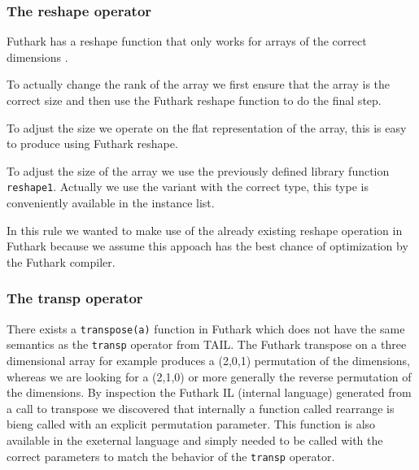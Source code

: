\documentclass[11pt]{article}
\begin{document}
\subsubsection{The reshape operator} 
Futhark has a reshape function that only works for arrays of the correct dimensions \cite{TroelsHenriksen}.

To actually change the rank of the array we first ensure that the array is the correct size and then use the Futhark reshape
function to do the final step.

To adjust the size we operate on the flat representation of the array, this is easy to produce using Futhark reshape.

To adjust the size of the array we use the previously defined library function {\tt reshape1}. Actually we use the variant with
the correct type, this type is conveniently available in the instance list.

In this rule we wanted to make use of the already existing reshape operation in Futhark because we assume this appoach has the best
chance of optimization by the Futhark compiler.

\subsubsection{The transp operator} 
There exists a {\tt transpose(a)} function in Futhark which does not have the same semantics as the {\tt transp} operator from TAIL.
The Futhark transpose on a three dimensional array for example produces a (2,0,1) permutation of the dimensions, whereas we are
looking for a (2,1,0) or more generally the reverse permutation of the dimensions.
By inspection the Futhark IL (internal language) generated from a call to transpose we discovered that internally a function called rearrange is bieng called with an explicit permutation parameter.
This function is also available in the exeternal language and simply needed to be called with the correct parameters to match the behavior of the {\tt transp} operator.
\end{document}

